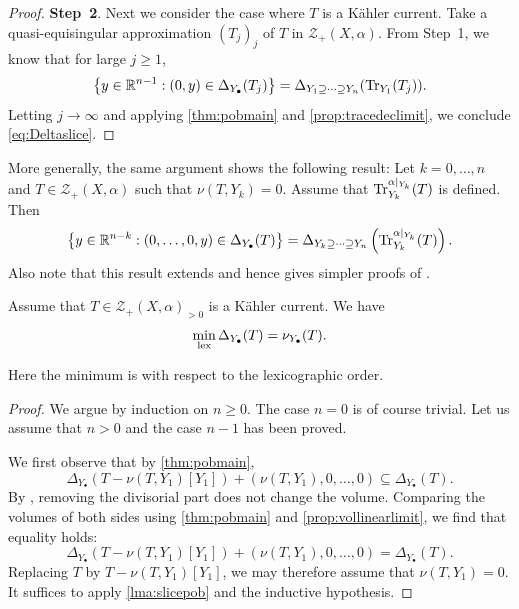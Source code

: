 \begin{proof}
    \textbf{Step~2}.
    Next we consider the case where $T$ is a Kähler current. Take a quasi-equisingular approximation $(T_j)_j$ of $T$ in $\mathcal{Z}_+(X,\alpha)$. From Step~1, we know that for large $j\geq 1$,
    \[
    \left\{y\in \mathbb{R}^{n-1}: (0,y)\in \Delta_{Y_{\bullet}}(T_j)\right\}=\Delta_{Y_1\supseteq \cdots \supseteq Y_n}(\operatorname{Tr}_{Y_1}(T_j)).
    \]
    Letting $j\to\infty$ and applying \cref{thm:pobmain} and \cref{prop:tracedeclimit}, we conclude \eqref{eq:Deltaslice}.
\end{proof}

\begin{remark}\label{rmk:slicepob}
    More generally, the same argument shows the following result: Let $k=0,\ldots,n$ and $T\in \mathcal{Z}_+(X,\alpha)$ such that $\nu(T,Y_k)=0$. Assume that $\operatorname{Tr}^{\alpha|_{Y_k}}_{Y_k}(T)$ is defined. Then
    \begin{equation}
        \left\{ y\in \mathbb{R}^{n-k}: (0,\ldots,0,y)\in \Delta_{Y_{\bullet}}(T)\right\}=\Delta_{Y_k\supseteq \cdots \supseteq Y_n}\left(\operatorname{Tr}^{\alpha|_{Y_k}}_{Y_k}(T)\right).
    \end{equation}
    Also note that this result extends \cite[Theorem~3.4]{Jow10} and hence gives simpler proofs of \cite[Theorem~A, Theorem~B]{Jow10}.
\end{remark}

\begin{theorem}\label{thm:KahcurrminOkoun}
Assume that $T\in \mathcal{Z}_+(X,\alpha)_{>0}$ is a Kähler current.
We have
\begin{equation}\label{eq:minOkounkov}
    \min_{\mathrm{lex}} \Delta_{Y_{\bullet}}(T)=\nu_{Y_{\bullet}}(T).
\end{equation}
\end{theorem}
Here the minimum is with respect to the lexicographic order.
\begin{proof}
We argue by induction on $n\geq 0$. The case $n=0$ is of course trivial. Let us assume that $n>0$ and the case $n-1$ has been proved.

We first observe that by \cref{thm:pobmain},
\[
\Delta_{Y_{\bullet}}(T-\nu(T,Y_1)[Y_1])+(\nu(T,Y_1),0,\ldots,0)\subseteq \Delta_{Y_{\bullet}}(T).
\]
By , removing the divisorial part does not change the volume. Comparing the volumes of both sides using \cref{thm:pobmain} and \cref{prop:vollinearlimit}, we find that equality holds:
\[
\Delta_{Y_{\bullet}}(T-\nu(T,Y_1)[Y_1])+(\nu(T,Y_1),0,\ldots,0)=\Delta_{Y_{\bullet}}(T).
\]
Replacing $T$ by $T-\nu(T,Y_1)[Y_1]$, we may therefore assume that $\nu(T,Y_1)=0$. It suffices to apply \cref{lma:slicepob} and the inductive hypothesis.
\end{proof}

